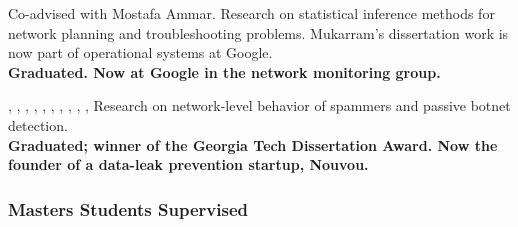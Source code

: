\begin{description}
{Co-advised with Mostafa Ammar. Research on statistical inference
  methods for network planning and troubleshooting problems.  Mukarram's
  dissertation work is now part of operational systems at Google.
  \\ {\bf Graduated. Now at Google in the network
    monitoring group.}} 

 {  
,
,
,
,
,
,
,
,
,
,
}{Research on network-level behavior of
spammers and passive botnet detection. \\ {\bf Graduated; winner of the
  Georgia Tech Dissertation Award.  Now the
  founder of a data-leak prevention startup, Nouvou.}}



\end{description}

\subsubsection{Masters Students Supervised}

